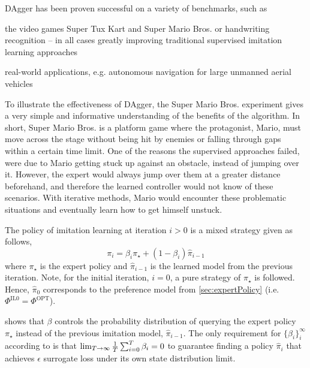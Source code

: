 \documentclass[smallextended]{svjour3}
\begin{document}
DAgger has been proven successful on a variety of benchmarks, such as
\begin{enumerate*}[label={{}}]
  \item the video games Super Tux Kart and Super Mario Bros. or
  handwriting recognition -- in all cases greatly improving traditional 
  supervised imitation learning approaches \cite{RossGB11}
  \item real-world applications, e.g. autonomous navigation for large unmanned 
  aerial vehicles \cite{Ross13}
\end{enumerate*}
To illustrate the effectiveness of DAgger, the Super Mario Bros. experiment 
gives a very simple and informative understanding of the benefits of the 
algorithm. In short, Super Mario Bros. is a platform game where the 
protagonist, Mario, must move across the stage without being hit by enemies or 
falling through gaps within a certain time limit. 
One of the reasons the supervised approaches failed, were due to Mario getting 
stuck up against an obstacle, instead of jumping over it. 
However, the expert would always jump over them at a greater distance 
beforehand, and therefore the learned controller would not know of these 
scenarios. 
With iterative methods, Mario would encounter these problematic situations and 
eventually learn how to get himself unstuck. 

The policy of imitation learning at iteration $i>0$ is a mixed strategy given 
as follows, 
\begin{equation}\label{eq:il}
\pi_i = \beta_i\pi_\star + (1-\beta_i)\hat{\pi}_{i-1}
\end{equation}
where $\pi_\star$ is the expert policy and $\hat{\pi}_{i-1}$ is the learned 
model from the previous iteration. 
Note, for the initial iteration, $i=0$, a pure strategy of $\pi_\star$ is 
followed. Hence, $\hat{\pi}_0$ corresponds to the preference model from 
\cref{sec:expertPolicy} (i.e. $\Phi^{\text{IL}0}=\Phi^{\text{OPT}}$). 

 shows that $\beta$ controls the probability distribution of 
querying the expert policy $\pi_\star$ instead of the previous imitation model, 
$\hat{\pi}_{i-1}$.  
The only requirement for $\{\beta_i\}_i^\infty$ according to \cite{RossGB11} is 
that $\limit{\frac{1}{T}\sum_{i=0}^T\beta_i}{T\to\infty}{0}$ to guarantee 
finding a policy $\hat{\pi}_i$ that achieves $\epsilon$ surrogate loss under 
its own state distribution limit.
\end{document}
